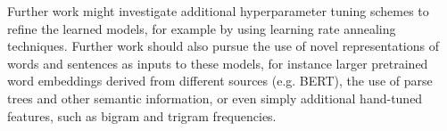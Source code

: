 \documentclass[11pt]{article}
\begin{document}
Further work might investigate additional hyperparameter tuning schemes to refine the learned models, for example by using learning rate annealing techniques. Further work should also pursue the use of novel representations of words and sentences as inputs to these models, for instance larger pretrained word embeddings derived from different sources (e.g. BERT), the use of parse trees and other semantic information, or even simply additional hand-tuned features, such as bigram and trigram frequencies.




\end{document}

